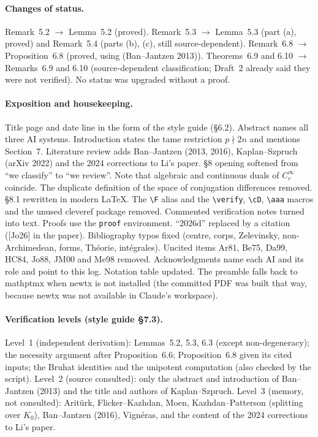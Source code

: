 \documentclass[12pt,letterpaper]{article}
\begin{document}
\paragraph{Changes of status.}
Remark~5.2 $\to$ Lemma~5.2 (proved).  Remark~5.3 $\to$ Lemma~5.3 (part (a), proved) and Remark~5.4
(parts (b), (c), still source-dependent).  Remark~6.8 $\to$ Proposition~6.8 (proved, using
(Ban--Jantzen 2013)).  Theorems~6.9 and 6.10 $\to$ Remarks~6.9 and 6.10 (source-dependent classification;
Draft~2 already said they were not verified).  No status was upgraded without a proof.

\paragraph{Exposition and housekeeping.}
Title page and date line in the form of the style guide (\S6.2).  Abstract names all three AI systems.
Introduction states the tame restriction $p\nmid2n$ and mentions Section~7.  Literature review adds
Ban--Jantzen (2013, 2016), Kaplan--Szpruch (arXiv 2022) and the 2024 corrections to Li's paper.
\S8 opening softened from ``we classify'' to ``we review''.  Note that algebraic and continuous duals
of $C_c^\infty$ coincide.  The duplicate definition of the space of conjugation differences removed.  \S8.1 rewritten in modern
\LaTeX.  The \verb|\F| alias and the \verb|\verify|, \verb|\cD|, \verb|\aaa| macros and the unused
cleveref package removed.  Commented verification notes turned into text.  Proofs use the
\texttt{proof} environment.  ``2026d'' replaced by a citation ([Jo26] in the paper).  Bibliography typos fixed
(centre, corps, Zelevinsky, non-Archimedean, forms, Th\'eorie, int\'egrales).  Uncited items Ar81, Be75,
Da99, HC84, Jo88, JM00 and Me98 removed.  Acknowledgments name each AI and its role and point to this log.
Notation table updated.  The preamble falls back to mathptmx when newtx is not installed (the
committed PDF was built that way, because newtx was not available in Claude's workspace).

\paragraph{Verification levels (style guide \S7.3).}
Level~1 (independent derivation): Lemmas~5.2, 5.3, 6.3 (except non-degeneracy); the necessity
argument after Proposition~6.6; Proposition~6.8 given its cited inputs; the Bruhat identities and the
unipotent computation (also checked by the script).  Level~2 (source consulted): only the abstract and
introduction of Ban--Jantzen (2013) and the title and authors of Kaplan--Szpruch.  Level~3 (memory,
not consulted): Arit\"urk, Flicker--Kazhdan, Moen, Kazhdan--Patterson (splitting over $K_0$),
Ban--Jantzen (2016), Vign\'eras, and the content of the 2024 corrections to Li's paper.
\end{document}
